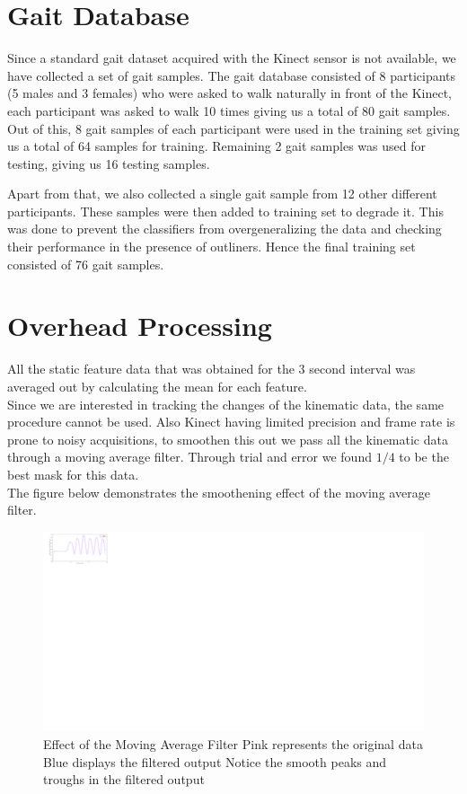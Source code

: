 \section{Gait Database} \label{Gait Database}

\noindent Since a standard gait dataset acquired with the Kinect sensor is not available, we have collected a set of gait samples. The gait database consisted of 8 participants (5 males and 3 females) who were asked to walk naturally in front of the Kinect, each participant was asked to walk 10 times giving us a total of 80 gait samples. Out of this, 8 gait samples of each participant were used in the training set giving us a total of 64 samples for training. Remaining 2 gait samples was used for testing, giving us 16 testing samples.

Apart from that, we also collected a single gait sample from 12 other different participants. These samples were then added to training set to degrade it. This was done to prevent the classifiers from overgeneralizing the data and checking their performance in the presence of outliners. Hence the final training set consisted of 76 gait samples.


\section{Overhead Processing} \label{Overhead Processing} 
\noindent All the static feature data that was obtained for the 3 second interval was averaged out by calculating the mean for each feature.\\                                                                                                                                                                                                               Since we are interested in tracking the changes of the kinematic data, the same procedure cannot be used. Also Kinect having limited precision and frame rate is prone to noisy acquisitions, to smoothen this out we pass all the kinematic data through a moving average filter. Through trial and error we found $1/4$ to be the best mask for this data.\\
The figure below demonstrates the smoothening effect of the moving average filter.

\begin{figure}[h]
\centering
\includegraphics[scale=0.4]{filter.png}
\caption{Effect of the Moving Average Filter Pink represents the original data Blue displays the filtered output Notice the smooth peaks and troughs in the filtered output
}
\end{figure}

